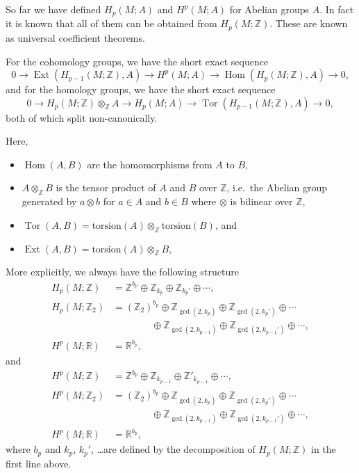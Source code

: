 \documentclass[12pt]{article}
\numberwithin{equation}{section}
\numberwithin{figure}{section}
\theoremstyle{remark}
\def\bR{\mathbb{R}}
\def\bZ{\mathbb{Z}}
\def\Hom{\mathop{\mathrm{Hom}}}
\def\Ext{\mathop{\mathrm{Ext}}}
\def\Tor{\mathop{\mathrm{Tor}}}
\begin{document}
So far we have defined $H_p(M;A)$ and $H^p(M;A)$ for Abelian groups $A$.
In fact it is known that all of them can be obtained from $H_p(M;\bZ)$.
These are known as universal coefficient theorems.
\begin{theorem}
For the cohomology groups, we have the short exact sequence \begin{equation}
0\to \Ext(H_{p-1}(M;\bZ),A) \to H^p(M;A) \to \Hom(H_p(M;\bZ),A) \to 0,
\end{equation} and for the homology groups, we have the short exact sequence
\begin{equation}
  0\to H_p(M;\bZ)\otimes_\bZ A \to H_p(M;A) \to \Tor(H_{p-1}(M;\bZ),A) \to 0,
\end{equation}
both of which split non-canonically.
\end{theorem}
Here, 
\begin{itemize}
\item $\Hom(A,B)$ are the homomorphisms from $A$ to $B$,
\item $A\otimes_\bZ B$ is the tensor product of $A$ and $B$ over $\bZ$,
i.e.~the Abelian group generated by $a\otimes b$ for $a\in A$ and $b\in B$
where $\otimes$ is bilinear over $\bZ$,
\item $\Tor(A,B)=\text{torsion}(A)\otimes_\bZ \text{torsion}(B)$, and 
\item $\Ext(A,B)=\text{torsion}(A)\otimes_\bZ B$,
\end{itemize}
More explicitly, we always have the following structure \begin{align}
  H_p(M;\bZ) &= \bZ^{b_p} \oplus \bZ_{k_{p}} \oplus \bZ_{k_{p}'}\oplus \cdots,\\
H_p(M;\bZ_2)&= (\bZ_2)^{b_p}\oplus \bZ_{\gcd(2,k_{p})}\oplus \bZ_{\gcd(2,k_{p}')} \oplus \cdots\\
& \qquad \qquad \oplus \bZ_{\gcd(2,k_{p-1})}\oplus \bZ_{\gcd(2,k_{p-1}')} \oplus \cdots ,\\
H^p(M;\bR)&= \bR^{b_p},
\end{align} and \begin{align}
  H^p(M;\bZ)&= \bZ^{b_p} \oplus \bZ_{k_{p-1}}\oplus \bZ'_{k_{p-1}} \oplus \cdots,\\
H^p(M;\bZ_2)&= (\bZ_2)^{b_p}\oplus \bZ_{\gcd(2,k_{p})}\oplus \bZ_{\gcd(2,k_{p}')} \oplus \cdots\\
&\qquad \qquad \oplus \bZ_{\gcd(2,k_{p-1})}\oplus \bZ_{\gcd(2,k_{p-1}')} \oplus\cdots, \\
H^p(M;\bR)&= \bR^{b_p},
\end{align}
where $b_p$ and $k_p$, $k_p'$, \ldots are defined by the decomposition 
of $H_p(M;\bZ)$ in the first line above.
\end{document}

